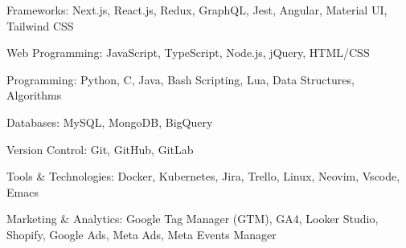 
\begin{cvskills}

  \cvskill
    {Frameworks:}
    {Next.js, React.js, Redux, GraphQL, Jest, Angular, Material UI, Tailwind CSS}

    
  \cvskill
    {Web Programming:}
    {JavaScript, TypeScript, Node.js, jQuery, HTML/CSS}


  \cvskill
    {Programming:}
    {Python, C, Java, Bash Scripting, Lua, Data Structures, Algorithms}


  \cvskill
    {Databases:}
    {MySQL, MongoDB, BigQuery}


  \cvskill
    {Version Control:}
    {Git, GitHub, GitLab}

 
  \cvskill
    {Tools \& Technologies:}
    {Docker, Kubernetes, Jira, Trello, Linux, Neovim, Vscode, Emacs}


  \cvskill
    {Marketing \& Analytics:}
    {Google Tag Manager (GTM), GA4, Looker Studio, Shopify, Google Ads, Meta Ads, Meta Events Manager}


\end{cvskills}

